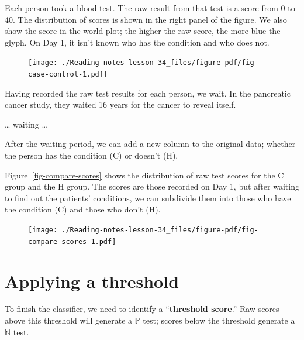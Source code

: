 \documentclass[
  letterpaper,
  DIV=11,
  numbers=noendperiod,
  oneside]{scrreprt}
\begin{document}
Each person took a blood test. The raw result from that test is a score
from 0 to 40. The distribution of scores is shown in the right panel of
the figure. We also show the score in the world-plot; the higher the raw
score, the more blue the glyph. On Day 1, it isn't known who has the
condition and who does not.

\begin{figure}


{\centering \texttt{[image: ./Reading-notes-lesson-34\_files/figure-pdf/fig-case-control-1.pdf]}

}

\end{figure}

Having recorded the raw test results for each person, we wait. In the
pancreatic cancer study, they waited 16 years for the cancer to reveal
itself.

\ldots{} waiting \ldots{}

After the waiting period, we can add a new column to the original data;
whether the person has the condition (C) or doesn't (H).

Figure~\ref{fig-compare-scores} shows the distribution of raw test
scores for the C group and the H group. The scores are those recorded on
Day 1, but after waiting to find out the patients' conditions, we can
subdivide them into those who have the condition (C) and those who don't
(H).

\begin{figure}


{\centering \texttt{[image: ./Reading-notes-lesson-34\_files/figure-pdf/fig-compare-scores-1.pdf]}

}

\end{figure}

\hypertarget{applying-a-threshold}{%
\section{Applying a threshold}\label{applying-a-threshold}}

To finish the classifier, we need to identify a ``\textbf{threshold
score}.'' Raw scores above this threshold will generate a
\({\mathbb{P}}\) test; scores below the threshold generate a
\({\mathbb{N}}\) test.
\end{document}
